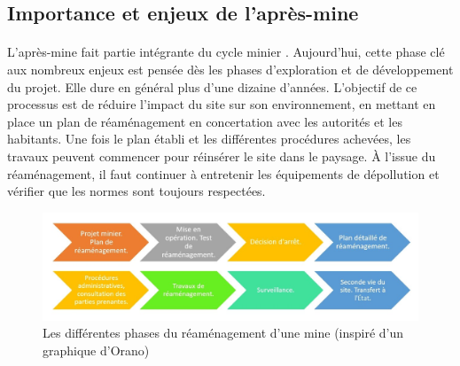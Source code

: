 \documentclass{article}
\begin{document}
\subsection{Importance et enjeux de l'après-mine}
\paragraph{} L’après-mine fait partie intégrante du cycle minier \cite{himeur_apres-mine_2020}. Aujourd’hui, cette phase clé aux nombreux enjeux est pensée dès les phases d’exploration et de développement du projet. Elle dure en général plus d'une dizaine d’années. L’objectif de ce processus est de réduire l’impact du site sur son environnement, en mettant en place un plan de réaménagement en concertation avec les autorités et les habitants. Une fois le plan établi et les différentes procédures achevées, les travaux peuvent commencer pour réinsérer le site dans le paysage. À l’issue du réaménagement, il faut continuer à entretenir les équipements de dépollution et vérifier que les normes sont toujours respectées.


\begin{figure}[H]
    \centering
    \includegraphics[width= \textwidth]{I_B_3.jpg}
    \caption{Les différentes phases du réaménagement d'une mine (inspiré d'un graphique d'Orano)}
    \label{fig:phases_reamenagement}
\end{figure}
\end{document}
